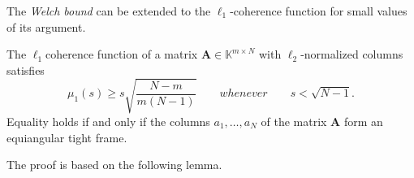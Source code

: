 The \emph{\textcolor[rgb]{1,0,0}{Welch bound}} can be extended to the $\ell_1$-coherence function for small values of its argument.

\begin{theorem}
    \label{1.8}
    The $\ell_1$coherence function of a matrix $\mathbf{A} \in \mathbb{K}^{m \times N}$ with $\ell_2$-normalized columns satisfies 
    \begin{equation}
        \mu_1(s) \geq s \sqrt{\dfrac{N-m}{m(N-1)}} \qquad whenever \qquad s < \sqrt{N-1}.
        \label{eq1.10}
    \end{equation}
    Equality holds if and only if the columns $a_1,\dots,a_N$ of the matrix $\mathbf{A}$ form an equiangular tight frame.
\end{theorem}

\textcolor[rgb]{1,0,0}{The proof is based on the following lemma}.

